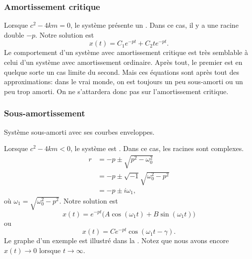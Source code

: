 \subsubsection{Amortissement critique}

Lorsque $c^2 - 4km = 0$, le système présente un \emph{}.  
Dans ce cas, il y a une racine double  $-p$.  Notre solution est 
\begin{equation*}
	x(t) = C_1 e^{-pt} + C_2 t e^{-pt} .
\end{equation*}
Le comportement d'un système avec amortissement critique est très semblable à celui d'un système avec amortissement ordinaire. Après tout, le premier est en quelque sorte un cas limite du second.  
Mais ces équations sont après tout des approximations: dans le vrai monde, 
on est toujours un peu sous-amorti ou un peu trop amorti. 
On ne s'attardera donc pas sur l'amortissement critique.

\subsubsection{Sous-amortissement}

\begin{mywrapfig}[13]{3.25in}
\capstart {}
\caption{Système sous-amorti avec ses courbes enveloppes.\label{mv:underdampedfig}}
\end{mywrapfig}
%
%
Lorsque $c^2 - 4km < 0$, le système est \emph{}. 
Dans ce cas, les racines sont complexes. 
\begin{align*}
	r & = -p \pm \sqrt{p^2 - \omega_0^2} \\
	  & = -p \pm \sqrt{-1}\sqrt{\omega_0^2 - p^2} \\
	  & = -p \pm i \omega_1 ,
\end{align*}
où $\omega_1 =\sqrt{\omega_0^2 - p^2}$.  Notre solution est
\begin{equation*}
	x(t) = e^{-pt} \bigl( A \cos (\omega_1 t) + B \sin (\omega_1 t) \bigr) 
\end{equation*}
ou
\begin{equation*}
	x(t) = C e^{-pt} \cos ( \omega_1 t - \gamma ) .
\end{equation*}
Le graphe d'un exemple est illustré dans la  .  
Notez que nous avons encore $x(t) \to 0$ lorsque $t \to \infty$.

